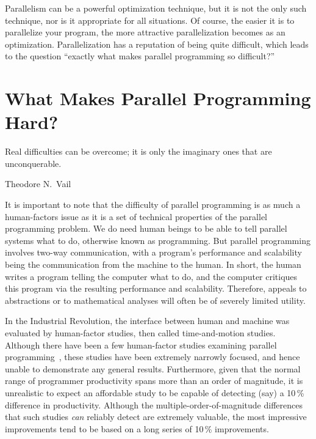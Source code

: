 Parallelism can be a powerful optimization technique, but
it is not the only such technique, nor is it appropriate for all
situations.
Of course, the easier it is to parallelize your program, the
more attractive parallelization becomes as an optimization.
Parallelization has a reputation of being quite difficult,
which leads to the question ``exactly what makes parallel
programming so difficult?''

\section{What Makes Parallel Programming Hard?}
\label{sec:intro:What Makes Parallel Programming Hard?}
%
\epigraph{Real difficulties can be overcome; it is only the imaginary
	  ones that are unconquerable.}{Theodore N.~Vail}


It is important to note that the difficulty of parallel programming
is as much a human-factors issue as it is a set of technical properties of the
parallel programming problem.
We do need human beings to be able to tell parallel
systems what to do, otherwise known as programming.
But parallel programming involves two-way communication, with
a program's performance and scalability being the communication from
the machine to the human.
In short, the human writes a program telling the computer what to do,
and the computer critiques this program via the resulting performance and
scalability.
Therefore, appeals to abstractions or to mathematical analyses will
often be of severely limited utility.

In the Industrial Revolution, the interface between human and machine
was evaluated by human-factor studies, then called time-and-motion
studies.
Although there have been a few human-factor studies examining parallel
programming~\cite{RyanEccles2005HPCSNovice,RyanEccles2006HPCSNoviceNeeds,
LorinHochstein2005SC,DuaneSzafron1994PEMPDS}, these studies have
been extremely narrowly focused, and hence unable to demonstrate any
general results.
Furthermore, given that the normal range of programmer productivity
spans more than an order of magnitude, it is unrealistic to expect
an affordable study to be capable of detecting (say) a 10\,\% difference
in productivity.
Although the multiple-order-of-magnitude differences that such studies
\emph{can} reliably detect are extremely valuable, the most impressive
improvements tend to be based on a long series of 10\,\% improvements.

